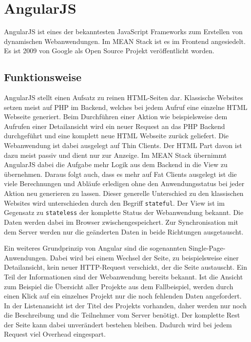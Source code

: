 \chapter{AngularJS}
\label{angularjs}

AngularJS ist eines der bekanntesten JavaScript Frameworks zum Erstellen von dynamischen Webanwendungen. Im MEAN Stack ist es im Frontend angesiedelt. Es ist 2009 von Google als Open Source Projekt veröffentlicht worden. 

\section{Funktionsweise}
AngularJS stellt einen Aufsatz zu reinen HTML-Seiten dar. 
Klassische Websites setzen meist auf PHP im Backend, welches bei jedem Aufruf eine einzelne HTML Webseite generiert.
Beim Durchführen einer Aktion wie beispielsweise dem Aufrufen einer Detailansicht wird ein neuer Request an das PHP Backend durchgeführt und eine komplett neue HTML Webseite zurück geliefert.
Die Webanwendung ist dabei ausgelegt auf Thin Clients.
Der HTML Part davon ist dazu meist passiv und dient nur zur Anzeige.
Im MEAN Stack übernimmt AngularJS dabei die Aufgabe mehr Logik aus dem Backend in die View zu übernehmen.
Daraus folgt auch, dass es mehr auf Fat Clients ausgelegt ist die viele Berechnungen und Abläufe erledigen ohne den Anwendungsstatus bei jeder Aktion neu generieren zu lassen.
Dieser generelle Unterschied zu den klassischen Websites wird unterschieden durch den Begriff \texttt{stateful}.
Der View ist im Gegensatz zu \texttt{stateless} der komplette Status der Webanwendung bekannt.
Die Daten werden dabei im Browser zwischengespeichert.
Zur Synchronisation mit dem Server werden nur die geänderten Daten in beide Richtungen ausgetauscht.

Ein weiteres Grundprinzip von Angular sind die sogenannten Single-Page-Anwendungen.
Dabei wird bei einem Wechsel der Seite, zu beispielsweise einer Detailansicht, kein neuer HTTP-Request verschickt, der die Seite austauscht.
Ein Teil der Informationen sind der Webanwendung bereits bekannt.
Ist die Ansicht zum Beispiel die Übersicht aller Projekte aus dem Fallbeispiel, werden durch einen Klick auf ein einzelnes Projekt nur die noch fehlenden Daten angefordert.
In der Listenansicht ist der Titel des Projekts vorhanden, daher werden nur noch die Beschreibung und die Teilnehmer vom Server benötigt.
Der komplette Rest der Seite kann dabei unverändert bestehen bleiben.
Dadurch wird bei jedem Request viel Overhead eingespart.

